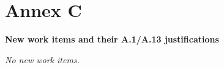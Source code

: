 
\clearpage
\section*{Annex C}\label{annex-c}



\begin{center}
\textbf{New work items and their A.1/A.13 justifications}
\end{center}

\ifx\annexNewWorkItems\undefined
\textit{No new work items.}
\else
\begin{itemize}
\annexNewWorkItems
\end{itemize}
\fi
